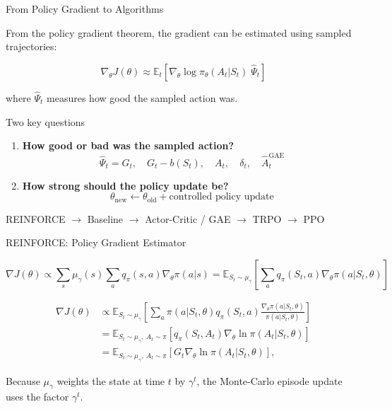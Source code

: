 \documentclass{beamer}
\begin{document}
\begin{frame}{From Policy Gradient to Algorithms}

From the policy gradient theorem, the gradient can be estimated using sampled trajectories:

\[
\nabla_\theta J(\theta)
\approx
\mathbb{E}_t
\left[
\nabla_\theta \log \pi_\theta(A_t|S_t)
\; \widehat{\Psi}_t
\right]
\]

where \(\widehat{\Psi}_t\) measures how good the sampled action was.

\vspace{0.3cm}

\begin{block}{Two key questions}
\begin{enumerate}
    \item \textbf{How good or bad was the sampled action?}
    \[
    \widehat{\Psi}_t
    =
    G_t,\quad
    G_t - b(S_t),\quad
    A_t,\quad
    \delta_t,\quad
    \widehat{A}^{\mathrm{GAE}}_t
    \]

    \item \textbf{How strong should the policy update be?}
    \[
    \theta_{\text{new}}
    \leftarrow
    \theta_{\text{old}}
    + \text{controlled policy update}
    \]
\end{enumerate}
\end{block}

\vspace{0.2cm}

\begin{center}
REINFORCE \(\rightarrow\) Baseline \(\rightarrow\) Actor-Critic / GAE
\(\rightarrow\) TRPO \(\rightarrow\) PPO
\end{center}

\end{frame}
\begin{frame}{REINFORCE: Policy Gradient Estimator}

\small

\[
\nabla J(\theta)
\propto
\sum_s \mu_\gamma(s)
\sum_a q_\pi(s,a)\nabla_\theta \pi(a|s)
=
\mathbb{E}_{S_t \sim \mu_\gamma}
\left[
\sum_a q_\pi(S_t,a)
\nabla_\theta \pi(a|S_t,\theta)
\right]
\]

\vspace{0.2cm}

\begin{align*}
\nabla J(\theta)
&\propto
\mathbb{E}_{S_t \sim \mu_\gamma}
\left[
\sum_a
\pi(a|S_t,\theta)
q_\pi(S_t,a)
\frac{
\nabla_\theta \pi(a|S_t,\theta)
}{
\pi(a|S_t,\theta)
}
\right]
\tag{1}
\\[0.15cm]
&=
\mathbb{E}_{S_t \sim \mu_\gamma,\ A_t \sim \pi}
\left[
q_\pi(S_t,A_t)
\nabla_\theta \ln \pi(A_t|S_t,\theta)
\right]
\tag{2}
\\[0.15cm]
&=
\mathbb{E}_{S_t \sim \mu_\gamma,\ A_t \sim \pi}
\left[
G_t
\nabla_\theta \ln \pi(A_t|S_t,\theta)
\right],
\tag{3}
\end{align*}

\vspace{0.1cm}

Because \(\mu_\gamma\) weights the state at time \(t\) by \(\gamma^t\),
the Monte-Carlo episode update uses the factor \(\gamma^t\).

\end{frame}
\end{document}

